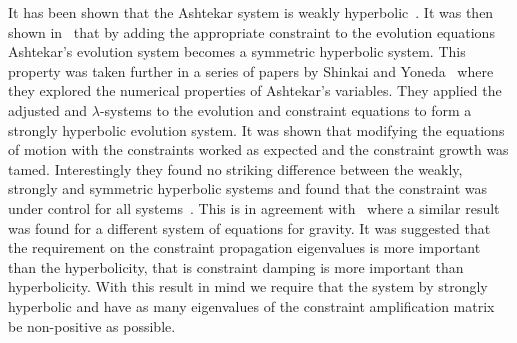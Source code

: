 \documentclass[10pt]{report}
\theoremstyle{definition}
\begin{document}
    It has been shown that the Ashtekar system is weakly hyperbolic~\cite{Constructing_hy_Yoneda_1999}. It was then shown in~\cite{Einstein_s_equa_Iriond_1997} that by adding the appropriate constraint to the evolution equations Ashtekar's evolution system becomes a symmetric hyperbolic system. This property was taken further in a series of papers by Shinkai and Yoneda~\cite{Constructing_hy_Yoneda_1999,Formulations_of_Shinka_2008,Hyperbolic_form_Shinka_2000,Hyperbolic_form_Yoneda_2001,Will_hyperbolic_Shinka_2001} where they explored the numerical properties of Ashtekar's variables. They applied the adjusted and $\lambda$-systems to the evolution and constraint equations to form a strongly hyperbolic evolution system. It was shown that modifying the equations of motion with the constraints worked as expected and the constraint growth was tamed. Interestingly they found no striking difference between the weakly, strongly and symmetric hyperbolic systems and found that the constraint was under control for all systems~\cite{Will_hyperbolic_Shinka_2001}. This is in agreement with~\cite{Numerical_Relat_Hern_2000} where a similar result was found for a different system of equations for gravity. It was suggested that the requirement on the constraint propagation eigenvalues is more important than the hyperbolicity, that is constraint damping is more important than hyperbolicity. With this result in mind we require that the system by strongly hyperbolic and have as many eigenvalues of the constraint amplification matrix be non-positive as possible.
\end{document}
